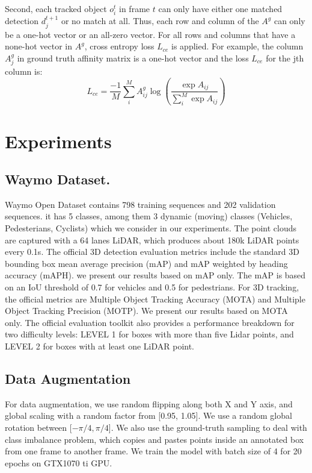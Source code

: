 \documentclass[10pt,twocolumn,letterpaper]{article}
\begin{document}
Second, each tracked object $o^{t}_{i}$ in frame $t$ can only have either one matched detection $d^{t+1}_{j}$ or no match at all. Thus, each row and column of the $A^{g}$ can only be a one-hot vector or an all-zero vector. For all rows and columns that have a none-hot vector in $A^{g}$, cross entropy loss $L_{ce}$ is applied. For example, the column $A^{g}_{j}$ in ground truth affinity matrix is a one-hot vector and the loss $L_{ce}$ for the jth column is:
\begin{equation}
L_{ce} = \frac{-1}{M}\sum^{M}_{i} A^{g}_{ij}\log(\frac{\exp{A_{ij}}}{\sum^{M}_{i}\exp{A_{ij}}})
\end{equation}




\section{Experiments}

\subsection{Waymo Dataset.} Waymo Open Dataset \cite{} contains 798 training sequences and 202 validation sequences. it has 5 classes, among them 3 dynamic (moving) classes (Vehicles, Pedesterians, Cyclists) which we consider in our experiments. The point clouds are captured with a 64 lanes LiDAR, which produces about 180k LiDAR points every 0.1s. The official 3D detection evaluation metrics include the standard 3D bounding box mean average precision (mAP) and mAP weighted by heading accuracy (mAPH). we present our results based on mAP only.  The mAP is based on an IoU threshold of 0.7 for vehicles and 0.5 for pedestrians. For 3D tracking, the official metrics are Multiple Object Tracking Accuracy (MOTA) and Multiple Object Tracking Precision (MOTP). We present our results based on MOTA only. The official evaluation toolkit also provides a performance breakdown for two difficulty levels: LEVEL 1 for boxes with more than five Lidar points, and LEVEL 2 for boxes with at least one LiDAR point.
\subsection{Data Augmentation}
For data augmentation, we use random flipping along both X and Y axis, and global scaling with a random factor from [0.95, 1.05]. We use a random global rotation between [$ -\pi/4, \pi/4$]. We also use the ground-truth sampling \cite{yan2018second} to deal with class imbalance problem, which copies and pastes points inside an annotated box from one frame to another frame. We train the model with batch size of 4 for 20 epochs on GTX1070 ti GPU.
\end{document}
